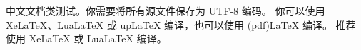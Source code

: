 \documentclass[UTF8]{ctexart}
\begin{document}
中文文档类测试。你需要将所有源文件保存为 UTF-8 编码。
你可以使用 XeLaTeX、LuaLaTeX 或 upLaTeX 编译，也可以使用 (pdf)LaTeX 编译。
推荐使用 XeLaTeX 或 LuaLaTeX 编译。
\end{document}
